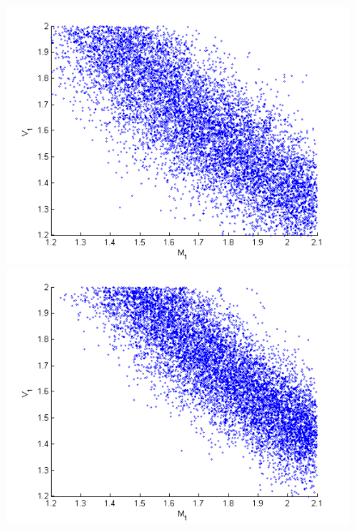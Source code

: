 \documentclass{article}
\newcommand{\nn}{0.16}
\begin{document}
\begin{figure}
\begin{center}
\begin{minipage}[b]{\nn\textwidth}
                \includegraphics[width=1\textwidth]{Figs2/col_c_stan10000_02.png} %
        \end{minipage}%
\begin{minipage}[b]{\nn\textwidth}
                \includegraphics[width=1\textwidth]{Figs2/col_c_stan_10000_000001.png} %
        \end{minipage}%
	\begin{minipage}[b]{\nn\textwidth}

\end{minipage}
\end{center}
\end{figure}
\end{document}
